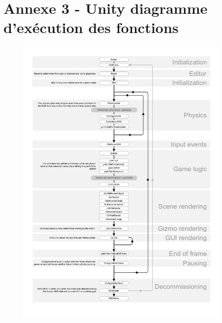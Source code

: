 \chapter*{Annexe 3 - Unity diagramme d'exécution des fonctions}
\label{annexe:unity}

\begin{figure}[H]
\centering
\includegraphics[width=0.93\textwidth]{images/monobehaviour_flowchart}
\end{figure}